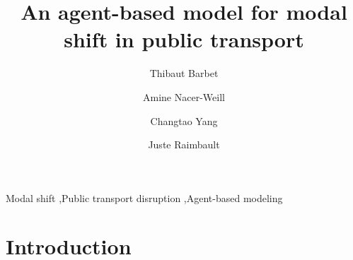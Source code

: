 \documentclass[3p,times,procedia]{elsarticle}
\begin{document}
\begin{frontmatter}


\title{An agent-based model for modal shift in public transport}

\author[a]{Thibaut Barbet}
\author[a]{Amine Nacer-Weill}
\author[a]{Changtao Yang}
\author[b]{Juste Raimbault}

\address[a]{Ecole des Ponts ParisTech, Champs-sur-Marne, France}
\address[b]{CASA, University College London, London, United Kingdom}

\begin{abstract}

\end{abstract}

\begin{keyword}
Modal shift \sep Public transport disruption \sep Agent-based modeling
\end{keyword}
\end{frontmatter}




\section{Introduction}


\cite{brisbois2010processus}

\cite{leng2020role}
\end{document}
